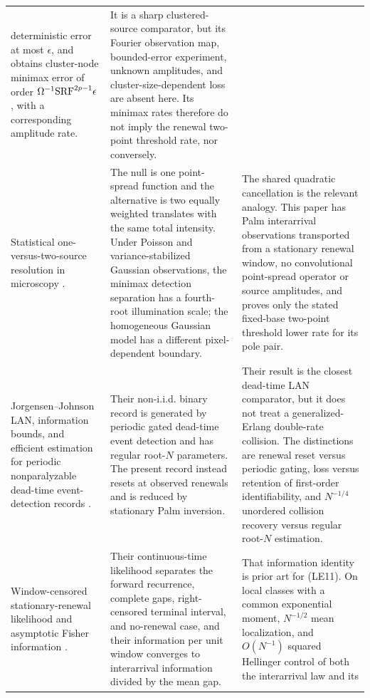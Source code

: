 \begin{longtable}{>{\raggedright\arraybackslash}p{}
>{\raggedright\arraybackslash}p{}
>{\raggedright\arraybackslash}p{}}
deterministic error at most \(\epsilon\), and obtains cluster-node minimax
error of order
\(\Omega^{-1}{\rm SRF}^{2p-1}\epsilon\), with a corresponding amplitude
rate. &
It is a sharp clustered-source comparator, but its Fourier observation map,
bounded-error experiment, unknown amplitudes, and cluster-size-dependent loss
are absent here.  Its minimax rates therefore do not imply the renewal
two-point threshold rate, nor conversely. \\
\addlinespace
Statistical one-versus-two-source resolution in microscopy
\cite{KulaitisMunkWerner2021Resolution}. &
The null is one point-spread function and the alternative is two equally
weighted translates with the same total intensity.  Under Poisson and
variance-stabilized Gaussian observations, the minimax detection separation
has a fourth-root illumination scale; the homogeneous Gaussian model has a
different pixel-dependent boundary. &
The shared quadratic cancellation is the relevant analogy.  This paper has
Palm interarrival observations transported from a stationary renewal window,
no convolutional point-spread operator or source amplitudes, and proves only
the stated fixed-base two-point threshold lower rate for its pole pair. \\
\addlinespace
Jorgensen--Johnson LAN, information bounds, and efficient estimation for
periodic nonparalyzable dead-time event-detection records
\cite{JorgensenJohnson2026DED}. &
Their non-i.i.d. binary record is generated by periodic gated dead-time event
detection and has regular root-\(N\) parameters.  The present record instead
resets at observed renewals and is reduced by stationary Palm inversion. &
Their result is the closest dead-time LAN comparator, but it does not treat a
generalized-Erlang double-rate collision.  The distinctions are renewal reset
versus periodic gating, loss versus retention of first-order identifiability,
and \(N^{-1/4}\) unordered collision recovery versus regular root-\(N\)
estimation. \\
\addlinespace
Window-censored stationary-renewal likelihood and asymptotic Fisher
information \cite{ZhaoNagaraja2011WindowCensoredRenewal}. &
Their continuous-time likelihood separates the forward recurrence, complete
gaps, right-censored terminal interval, and no-renewal case, and their
information per unit window converges to interarrival information divided by
the mean gap. &
That information identity is prior art for \textup{(LE11)}.  On local classes
with a common exponential moment, \(N^{-1/2}\) mean localization, and
\(O(N^{-1})\) squared Hellinger control of both the interarrival law and its

\end{longtable}
